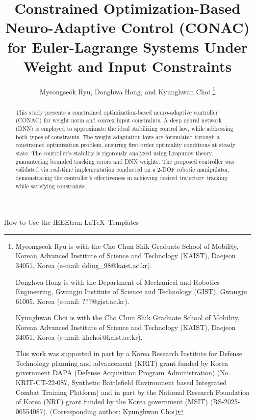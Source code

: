 \documentclass[lettersize,journal]{IEEEtran}
\begin{document}
\title{
    Constrained Optimization-Based Neuro-Adaptive Control (CONAC) for Euler-Lagrange Systems Under Weight and Input Constraints
} %

\author{
  Myeongseok Ryu, Donghwa Hong, and Kyunghwan Choi
\thanks{
    Myeongseok Ryu is with the Cho Chun Shik Graduate School of Mobility, Korean Advanced Institute of Science and Technology (KAIST), Daejeon 34051, Korea (e-mail: dding\_98@kaist.ac.kr).

    Donghwa Hong is with the Department of Mechanical and Robotics Engineering, Gwangju Institute of Science and Technology (GIST), Gwangju 61005, Korea (e-mail: ???@gist.ac.kr).

    Kyunghwan Choi is with the Cho Chun Shik Graduate School of Mobility, Korean Advanced Institute of Science and Technology (KAIST), Daejeon 34051, Korea (e-mail: khchoi@kaist.ac.kr).
    
    This work was supported in part by a Korea Research Institute for Defense Technology planning and advancement (KRIT) grant funded by Korea government DAPA (Defense Acquisition Program Administration) (No. KRIT-CT-22-087, Synthetic Battlefield Environment based Integrated Combat Training Platform) and in part by the National Research Foundation of Korea (NRF) grant funded by the Korea government (MSIT) (RS-2025- 00554087). (Corresponding author: Kyunghwan Choi)
    }}

%
{How to Use the IEEEtran \LaTeX \ Templates}

\maketitle

\begin{abstract}
  This study presents a constrained optimization-based neuro-adaptive controller (CONAC) for weight norm and convex input constraints. 
  A deep neural network (DNN) is employed to approximate the ideal stabilizing control law, while addressing both types of constraints. 
  The weight adaptation laws are formulated through a constrained optimization problem, ensuring first-order optimality conditions at steady state. 
  The controller's stability is rigorously analyzed using Lyapunov theory, guaranteeing bounded tracking errors and DNN weights. 
  The proposed controller was validated via real-time implementation conducted on a 2-DOF robotic manipulator, demonstrating the controller's effectiveness in achieving desired trajectory tracking while satisfying constraints.
\end{abstract}
\end{document}
